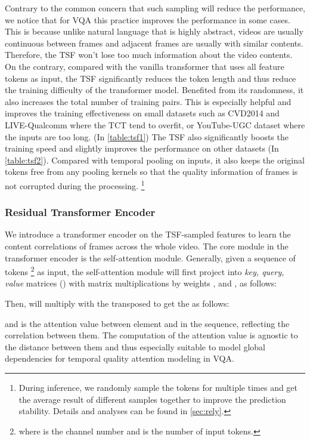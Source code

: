 \documentclass[journal]{IEEEtran}
\begin{document}
Contrary to the common concern that such sampling will reduce the performance, we notice that for VQA this practice improves the performance in some cases. This is because unlike natural language that is highly abstract, videos are usually continuous between frames and adjacent frames are usually with similar contents. Therefore, the TSF won't lose too much information about the video contents. On the contrary, compared with the vanilla transformer that uses all feature tokens as input, the TSF significantly reduces the token length and thus reduce the training difficulty of the transformer model. Benefited from its randomness, it also increases the total number of training pairs. This is especially helpful and improves the training effectiveness on small datasets such as CVD2014\cite{cvd} and LIVE-Qualcomm\cite{qualcomm} where the TCT tend to overfit, or YouTube-UGC\cite{ytugc} dataset where the inputs are too long. (In \cref{table:tsf1}) The TSF also significantly boosts the training speed and slightly improves the performance on other datasets (In \cref{table:tsf2}). Compared with temporal pooling on inputs, it also keeps the original tokens free from any pooling kernels so that the quality information of frames is not corrupted during the processing. \footnote{During inference, we randomly sample the tokens for  multiple times and get the average result of different samples together to improve the prediction stability. Details and analyses can be found in \cref{sec:rely}.}



\subsubsection{Residual Transformer Encoder} 
We introduce a transformer encoder on the TSF-sampled features to learn the content correlations of frames across the whole video. The core module in the transformer encoder is the self-attention module\cite{allyouneed}. Generally, given a sequence of tokens \footnote{where  is the channel number and  is the number of input tokens.} as input, the self-attention module will first project  into \textit{key, query, value} matrices () with matrix multiplications by weights ,  and , as follows:

Then,  will multiply with the transposed  to get the  as follows:

and  is the attention value between element  and  in the sequence, reflecting the correlation between them. The computation of the attention value is agnostic to the distance between them and thus especially suitable to model global dependencies for temporal quality attention modeling in VQA.
\end{document}
